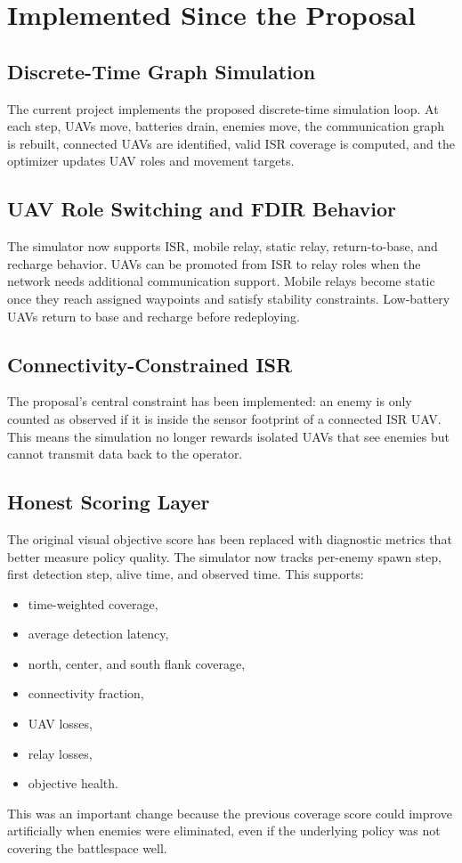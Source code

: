 \documentclass[conference]{IEEEtran}
\begin{document}
\section{Implemented Since the Proposal}

\subsection{Discrete-Time Graph Simulation}
The current project implements the proposed discrete-time simulation loop. At
each step, UAVs move, batteries drain, enemies move, the communication graph is
rebuilt, connected UAVs are identified, valid ISR coverage is computed, and the
optimizer updates UAV roles and movement targets.

\subsection{UAV Role Switching and FDIR Behavior}
The simulator now supports ISR, mobile relay, static relay, return-to-base, and
recharge behavior. UAVs can be promoted from ISR to relay roles when the network
needs additional communication support. Mobile relays become static once they
reach assigned waypoints and satisfy stability constraints. Low-battery UAVs
return to base and recharge before redeploying.

\subsection{Connectivity-Constrained ISR}
The proposal's central constraint has been implemented: an enemy is only counted
as observed if it is inside the sensor footprint of a connected ISR UAV. This
means the simulation no longer rewards isolated UAVs that see enemies but cannot
transmit data back to the operator.

\subsection{Honest Scoring Layer}
The original visual objective score has been replaced with diagnostic metrics
that better measure policy quality. The simulator now tracks per-enemy spawn
step, first detection step, alive time, and observed time. This supports:
\begin{itemize}
    \item time-weighted coverage,
    \item average detection latency,
    \item north, center, and south flank coverage,
    \item connectivity fraction,
    \item UAV losses,
    \item relay losses,
    \item objective health.
\end{itemize}
This was an important change because the previous coverage score could improve
artificially when enemies were eliminated, even if the underlying policy was not
covering the battlespace well.
\end{document}
